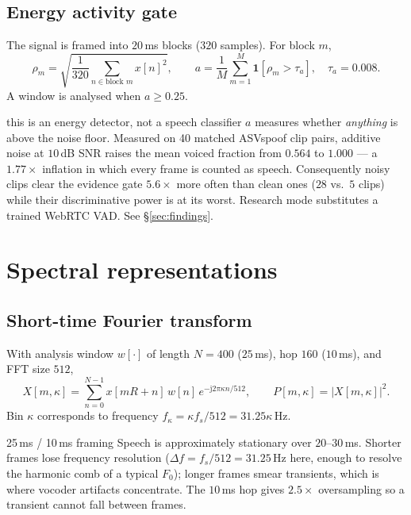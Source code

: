 \documentclass[11pt,a4paper]{article}
\begin{document}
\subsection{Energy activity gate}

The signal is framed into $20$\,ms blocks ($320$ samples). For block $m$,
\begin{equation}
\rho_m = \sqrt{\frac{1}{320}\sum_{n \in \text{block } m} x[n]^2},
\qquad
a = \frac{1}{M}\sum_{m=1}^{M} \mathbf{1}[\rho_m > \tau_a], \quad \tau_a = 0.008 .
\end{equation}
A window is analysed when $a \ge 0.25$.

\begin{warnbox}{this is an energy detector, not a speech classifier}
$a$ measures whether \emph{anything} is above the noise floor. Measured on 40 matched
ASVspoof clip pairs, additive noise at $10$\,dB SNR raises the mean voiced fraction from
$0.564$ to $1.000$ --- a $1.77\times$ inflation in which every frame is counted as speech.
Consequently noisy clips clear the evidence gate $5.6\times$ more often than clean ones
($28$ vs.\ $5$ clips) while their discriminative power is at its worst. Research mode
substitutes a trained WebRTC VAD. See \S\ref{sec:findings}.
\end{warnbox}

\section{Spectral representations}

\subsection{Short-time Fourier transform}

With analysis window $w[\cdot]$ of length $N=400$ ($25$\,ms), hop $160$ ($10$\,ms),
and FFT size $512$,
\begin{equation}
X[m,\kappa] = \sum_{n=0}^{N-1} x[mR+n]\, w[n]\, e^{-\mathrm{j}2\pi \kappa n / 512},
\qquad P[m,\kappa] = |X[m,\kappa]|^2 .
\end{equation}
Bin $\kappa$ corresponds to frequency $f_\kappa = \kappa f_s/512 = 31.25\kappa$\,Hz.

\begin{whybox}{25\,ms / 10\,ms framing}
Speech is approximately stationary over $20$--$30$\,ms. Shorter frames lose frequency
resolution ($\Delta f = f_s/512 = 31.25$\,Hz here, enough to resolve the harmonic comb
of a typical $F_0$); longer frames smear transients, which is where vocoder artifacts
concentrate. The $10$\,ms hop gives $2.5\times$ oversampling so a transient cannot fall
between frames.
\end{whybox}
\end{document}
